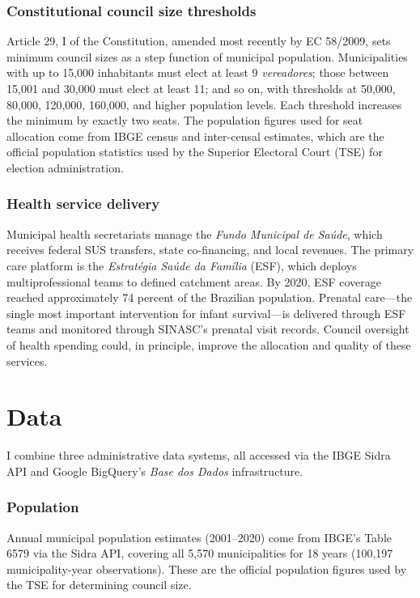 \documentclass[12pt]{article}
\begin{document}
\subsubsection*{Constitutional council size thresholds} Article 29, I of the Constitution, amended most recently by EC 58/2009, sets minimum council sizes as a step function of municipal population. Municipalities with up to 15,000 inhabitants must elect at least 9 \textit{vereadores}; those between 15,001 and 30,000 must elect at least 11; and so on, with thresholds at 50,000, 80,000, 120,000, 160,000, and higher population levels. Each threshold increases the minimum by exactly two seats. The population figures used for seat allocation come from IBGE census and inter-censal estimates, which are the official population statistics used by the Superior Electoral Court (TSE) for election administration.

\subsubsection*{Health service delivery} Municipal health secretariats manage the \textit{Fundo Municipal de Sa\'{u}de}, which receives federal SUS transfers, state co-financing, and local revenues. The primary care platform is the \textit{Estrat\'{e}gia Sa\'{u}de da Fam\'{i}lia} (ESF), which deploys multiprofessional teams to defined catchment areas. By 2020, ESF coverage reached approximately 74 percent of the Brazilian population. Prenatal care---the single most important intervention for infant survival---is delivered through ESF teams and monitored through SINASC's prenatal visit records. Council oversight of health spending could, in principle, improve the allocation and quality of these services.


\section{Data}

I combine three administrative data systems, all accessed via the IBGE Sidra API and Google BigQuery's \textit{Base dos Dados} infrastructure.

\subsubsection*{Population} Annual municipal population estimates (2001--2020) come from IBGE's Table 6579 via the Sidra API, covering all 5,570 municipalities for 18 years (100,197 municipality-year observations). These are the official population figures used by the TSE for determining council size.
\end{document}
